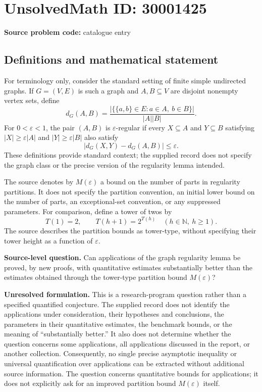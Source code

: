 \documentclass[11pt]{article}
\newcommand{\N}{\mathbb{N}}
\begin{document}
\section*{UnsolvedMath ID: 30001425}
\textbf{Source problem code:} catalogue entry
\subsection{Definitions and mathematical statement}
For terminology only, consider the standard setting of finite simple undirected graphs. If \(G=(V,E)\) is such a graph and \(A,B\subseteq V\) are disjoint nonempty vertex sets, define
\[
 d_G(A,B)=\frac{|\{\{a,b\}\in E:a\in A,\ b\in B\}|}{|A||B|}.
\]
For \(0<\varepsilon<1\), the pair \((A,B)\) is \(\varepsilon\)-regular if every \(X\subseteq A\) and \(Y\subseteq B\) satisfying \(|X|\geq\varepsilon|A|\) and \(|Y|\geq\varepsilon|B|\) also satisfy
\[
 |d_G(X,Y)-d_G(A,B)|\leq\varepsilon.
\]
These definitions provide standard context; the supplied record does not specify the graph class or the precise version of the regularity lemma intended.

The source denotes by \(M(\varepsilon)\) a bound on the number of parts in regularity partitions. It does not specify the partition convention, an initial lower bound on the number of parts, an exceptional-set convention, or any suppressed parameters. For comparison, define a tower of twos by
\[
 T(1)=2,\qquad T(h+1)=2^{T(h)}\quad(h\in\N,\ h\geq1).
\]
The source describes the partition bounds as tower-type, without specifying their tower height as a function of \(\varepsilon\).

\textbf{Source-level question.} Can applications of the graph regularity lemma be proved, by new proofs, with quantitative estimates substantially better than the estimates obtained through the tower-type partition bound \(M(\varepsilon)\)?

\textbf{Unresolved formulation.} This is a research-program question rather than a specified quantified conjecture. The supplied record does not identify the applications under consideration, their hypotheses and conclusions, the parameters in their quantitative estimates, the benchmark bounds, or the meaning of ``substantially better.'' It also does not determine whether the question concerns some applications, all applications discussed in the report, or another collection. Consequently, no single precise asymptotic inequality or universal quantification over applications can be extracted without additional source information. The question concerns quantitative bounds for applications; it does not explicitly ask for an improved partition bound \(M(\varepsilon)\) itself.
\end{document}
